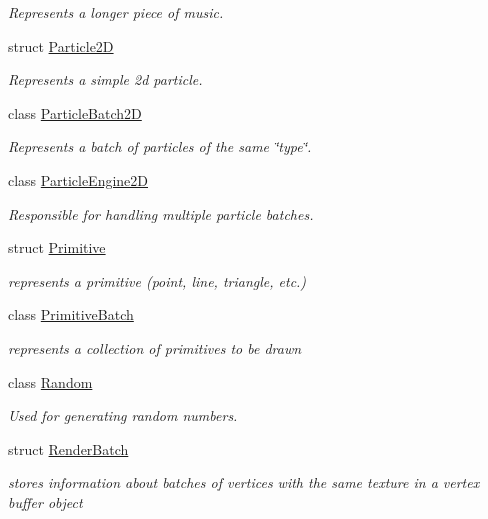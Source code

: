 \begin{DoxyCompactItemize}
\begin{DoxyCompactList}\small\item\em Represents a longer piece of music. \end{DoxyCompactList}\item 
struct \hyperlink{structnta_1_1Particle2D}{Particle2D}
\begin{DoxyCompactList}\small\item\em Represents a simple 2d particle. \end{DoxyCompactList}\item 
class \hyperlink{classnta_1_1ParticleBatch2D}{Particle\+Batch2D}
\begin{DoxyCompactList}\small\item\em Represents a batch of particles of the same \char`\"{}type\char`\"{}. \end{DoxyCompactList}\item 
class \hyperlink{classnta_1_1ParticleEngine2D}{Particle\+Engine2D}
\begin{DoxyCompactList}\small\item\em Responsible for handling multiple particle batches. \end{DoxyCompactList}\item 
struct \hyperlink{structnta_1_1Primitive}{Primitive}
\begin{DoxyCompactList}\small\item\em represents a primitive (point, line, triangle, etc.) \end{DoxyCompactList}\item 
class \hyperlink{classnta_1_1PrimitiveBatch}{Primitive\+Batch}
\begin{DoxyCompactList}\small\item\em represents a collection of primitives to be drawn \end{DoxyCompactList}\item 
class \hyperlink{classnta_1_1Random}{Random}
\begin{DoxyCompactList}\small\item\em Used for generating random numbers. \end{DoxyCompactList}\item 
struct \hyperlink{structnta_1_1RenderBatch}{Render\+Batch}
\begin{DoxyCompactList}\small\item\em stores information about batches of vertices with the same texture in a vertex buffer object \end{DoxyCompactList}\item 

\end{DoxyCompactItemize}
